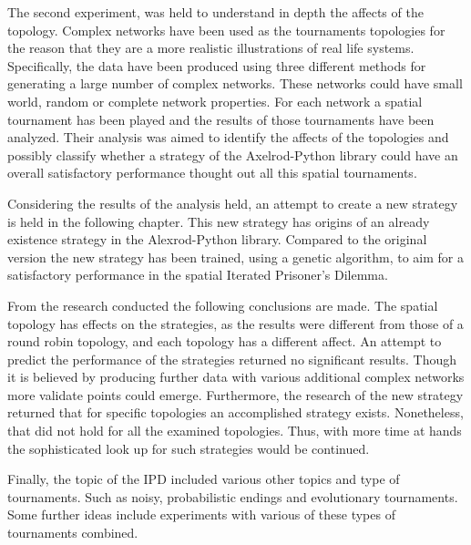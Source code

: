 The second experiment, was held to understand in depth the affects of the
topology. Complex networks have been used as the tournaments topologies for the
reason that they are a more realistic illustrations of real life systems.
Specifically, the data have been produced using three different methods for
generating a large number of complex networks. These networks could have small world,
random or complete network properties. For each network a spatial tournament has
been played and the results of those tournaments have been analyzed. Their analysis
was aimed to identify the affects of the topologies and possibly classify whether
a strategy of the Axelrod-Python library could have an overall satisfactory performance
thought out all this spatial tournaments.

Considering the results of the analysis held, an attempt to create a new strategy
is held in the following chapter. This new strategy has origins of an already existence
strategy in the Alexrod-Python library. Compared to the original version the new
strategy has been trained, using a genetic algorithm, to aim for a satisfactory
performance in the spatial Iterated Prisoner's Dilemma.

From the research conducted  the following conclusions are made.
The spatial topology has effects on the strategies, as the results were different
from those of a round robin topology, and each topology has a different affect. An attempt
to predict the performance of the strategies returned no significant results. Though
it is believed by producing further data with various additional complex networks
more validate points could emerge. Furthermore, the research of the new strategy
returned that for specific topologies an accomplished strategy exists.
Nonetheless, that did not hold for all the examined topologies. Thus,
with more time at hands the sophisticated look up for such strategies would be
continued.

Finally, the topic of the IPD included various other topics and type of tournaments.
Such as noisy, probabilistic endings and evolutionary tournaments. Some further
ideas include experiments with various of these types of tournaments combined.
